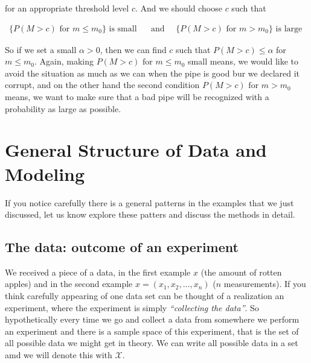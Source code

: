 \documentclass[ 11pt,%
				a4paper,%
				twoside,%
				headinclude,%
				footinclude = true,%
				cleardoublepage = empty,%
				reqno]{scrbook}
\begin{document}
\begin{example}
    for an appropriate threshold level $c$. And we should choose $c$ such that

    \begin{align*}
        \{P(M>c) \text { for } m \leq m_{0}\} \text{ is small }\quad \text{ and } \quad \{P(M>c) \text{ for } m > m_{0}\} \text{ is large }
    \end{align*}
    

    So if we set a small $\alpha>0$, then we can find $c$ such that $P(M>c) \leq \alpha$ for  $m \leq m_{0}$. Again, making $P(M>c) \text { for } m \leq m_{0}$ small means, we would like to avoid the situation as much as we can when the pipe is good bur we declared it corrupt, and on the other hand the second condition $P(M>c) \text{ for } m > m_{0}$ means, we want to make sure that a bad pipe will be recognized with a probability as large as possible. 



\end{example}

\section{General Structure of Data and Modeling}

If you notice carefully there is a general patterns in the examples that we just discussed, let us know explore these patters and discuss the methods in detail.


\subsection{The data: outcome of an experiment}

    We received a piece of a data, in the first example $x$ (the amount of rotten apples) and in the second example $x = (x_1, x_2, \ldots, x_n)$ ($n$ measurements). If you think carefully appearing of one data set can be thought of a realization an experiment, where the experiment is simply \emph{``collecting the data''}. So hypothetically every time we go and collect a data from somewhere we perform an experiment and there is a sample space of this experiment, that is the set of all possible data we might get in theory. We can write all possible data in a set amd we will denote this with $\mathcal{X}$. 
\end{document}
